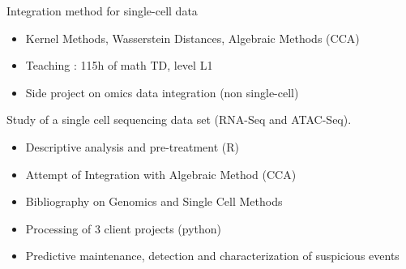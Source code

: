 \documentclass[10pt,a4paper]{altacv}
\begin{document}

 Integration method for single-cell data
\begin{itemize}
\item Kernel Methods, Wasserstein Distances, Algebraic Methods (CCA)
\item Teaching : 115h of math TD, level L1
\item Side project on omics data integration (non single-cell)
\end{itemize}

Study of a single cell sequencing data set (RNA-Seq and ATAC-Seq). 
\begin{itemize}
\item Descriptive analysis and pre-treatment (R) 
\item Attempt of Integration with Algebraic Method (CCA) 
\item Bibliography on Genomics and Single Cell Methods
\end{itemize}

{}

\begin{itemize}
\item Processing of 3 client projects (python)
\item Predictive maintenance, detection and characterization of suspicious events
\end{itemize}
\end{document}

